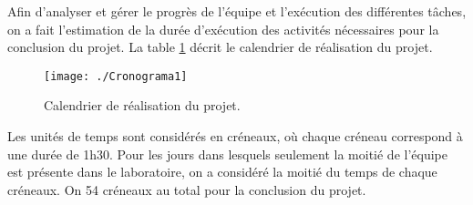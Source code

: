 
Afin d’analyser et gérer le progrès de l’équipe et l'exécution des différentes tâches, on a fait l’estimation de la durée d’exécution des activités nécessaires pour la conclusion du projet. La table \ref{fig:cronograma1} décrit le calendrier de réalisation du projet.

\begin{figure}[H]
	\begin{center}	
		\texttt{[image: ./Cronograma1]}
		\caption{Calendrier de réalisation du projet.}
		\label{fig:cronograma1}
	\end{center}
\end{figure}

Les unités de temps sont considérés en créneaux, où chaque créneau correspond à une durée de 1h30. Pour les jours dans lesquels seulement la moitié de l’équipe est présente dans le laboratoire, on a considéré la moitié du temps de chaque créneaux. 
On 54 créneaux au total pour la conclusion du projet.
